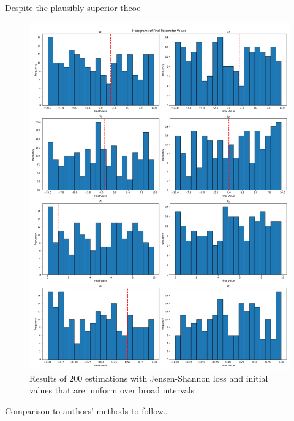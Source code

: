 Despite the plausibly superior theoe

\begin{figure}
    \includegraphics[width=\textwidth]{./Images/js_wide_uniform_histograms.png}
    \caption{Results of 200 estimations with Jensen-Shannon loss and initial values that are uniform over broad intervals}
    \label{fig:js_wide_uniform_histograms}
\end{figure}

Comparison to authors' methods to follow\dots